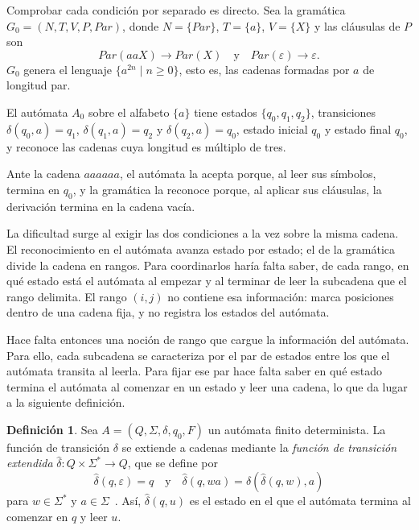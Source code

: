 \documentclass{report}
\theoremstyle{definition}
\newtheorem{definicion}{Definición}[chapter]
\theoremstyle{plain}
\theoremstyle{remark}
\begin{document}
Comprobar cada condición por separado es directo. Sea la gramática
$G_0 = (N, T, V, P, Par)$, donde $N = \{Par\}$, $T = \{a\}$, $V = \{X\}$
y las cláusulas de $P$ son
\[
  Par(aaX) \to Par(X) \quad\text{y}\quad Par(\varepsilon) \to \varepsilon.
\]
$G_0$ genera el lenguaje $\{a^{2n} \mid n \ge 0\}$, esto es, las cadenas
formadas por $a$ de longitud par.

El autómata $A_0$ sobre el alfabeto $\{a\}$ tiene estados
$\{q_0, q_1, q_2\}$, transiciones $\delta(q_0, a) = q_1$,
$\delta(q_1, a) = q_2$ y $\delta(q_2, a) = q_0$, estado inicial $q_0$ y
estado final $q_0$, y reconoce las cadenas cuya longitud es múltiplo de
tres.

\begin{center}
\end{center}

Ante la cadena $aaaaaa$, el autómata la acepta porque, al leer sus
símbolos, termina en $q_0$, y la gramática la reconoce porque, al aplicar
sus cláusulas, la derivación termina en la cadena vacía.

La dificultad surge al exigir las dos condiciones a la vez sobre la
misma cadena. El reconocimiento en el autómata avanza estado por estado;
el de la gramática divide la cadena en rangos. Para coordinarlos haría
falta saber, de cada rango, en qué estado está el autómata al empezar y
al terminar de leer la subcadena que el rango delimita. El rango $(i, j)$
no contiene esa información: marca posiciones dentro de una cadena fija,
y no registra los estados del autómata.

Hace falta entonces una noción de rango que cargue la información del
autómata. Para ello, cada subcadena se caracteriza por el par de estados
entre los que el autómata transita al leerla. Para fijar ese par hace
falta saber en qué estado termina el autómata al comenzar en un estado y
leer una cadena, lo que da lugar a la siguiente definición.

\begin{definicion}
Sea $A = (Q, \Sigma, \delta, q_0, F)$ un autómata finito determinista. La
función de transición $\delta$ se extiende a cadenas mediante la
\emph{función de transición extendida}
$\hat\delta : Q \times \Sigma^* \to Q$, que se define por
\[
  \hat\delta(q, \varepsilon) = q \quad\text{y}\quad
  \hat\delta(q, wa) = \delta(\hat\delta(q, w), a)
\]
para $w \in \Sigma^*$ y $a \in \Sigma$~\cite{hopcroft2006introduction}.
Así, $\hat\delta(q, u)$ es el estado en el que el autómata termina al
comenzar en $q$ y leer $u$.
\end{definicion}
\end{document}
